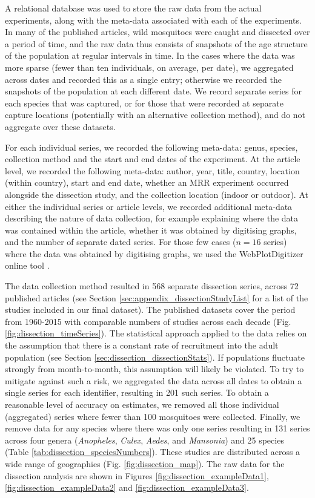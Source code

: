 \documentclass[12pt]{article}
\begin{document}
{A relational database was used to store the raw data from the actual experiments, along with the meta-data associated with each of the experiments. In many of the published articles, wild mosquitoes were caught and dissected over a period of time, and the raw data thus consists of snapshots of the age structure of the population at regular intervals in time. In the cases where the data was more sparse (fewer than ten individuals, on average, per date), we aggregated across dates and recorded this as a single entry; otherwise we recorded the snapshots of the population at each different date. We record separate series for each species that was captured, or for those that were recorded at separate capture locations (potentially with an alternative collection method), and do not aggregate over these datasets.

For each individual series, we recorded the following meta-data: genus, species, collection method and the start and end dates of the experiment. At the article level, we recorded the following meta-data: author, year, title, country, location (within country), start and end date, whether an MRR experiment occurred alongside the dissection study, and the collection location (indoor or outdoor). At either the individual series or article levels, we recorded additional meta-data describing the nature of data collection, for example explaining where the data was contained within the article, whether it was obtained by digitising graphs, and the number of separate dated series. For those few cases ($n=16$ series) where the data was obtained by digitising graphs, we used the WebPlotDigitizer online tool \citep{digitise}.

The data collection method resulted in 568 separate dissection series, across 72 published articles (see Section \ref{sec:appendix_dissectionStudyList} for a list of the studies included in our final dataset). The published datasets cover the period from 1960-2015 with comparable numbers of studies across each decade (Fig. \ref{fig:dissection_timeSeries}). The statistical approach applied to the data relies on the assumption that there is a constant rate of recruitment into the adult population (see Section \ref{sec:dissection_dissectionStats}). If populations fluctuate strongly from month-to-month, this assumption will likely be violated. To try to mitigate against such a risk, we aggregated the data across all dates to obtain a single series for each identifier, resulting in 201 such series. To obtain a reasonable level of accuracy on estimates, we removed all those individual (aggregated) series where fewer than 100 mosquitoes were collected. Finally, we remove data for any species where there was only one series resulting in 131 series across four genera (\textit{Anopheles}, \textit{Culex}, \textit{Aedes}, and \textit{Mansonia}) and 25 species (Table \ref{tab:dissection_speciesNumbers}). These studies are distributed across a wide range of geographies (Fig. \ref{fig:dissection_map}). The raw data for the dissection analysis are shown in Figures \ref{fig:dissection_exampleData1}, \ref{fig:dissection_exampleData2} and \ref{fig:dissection_exampleData3}.


}
\end{document}
